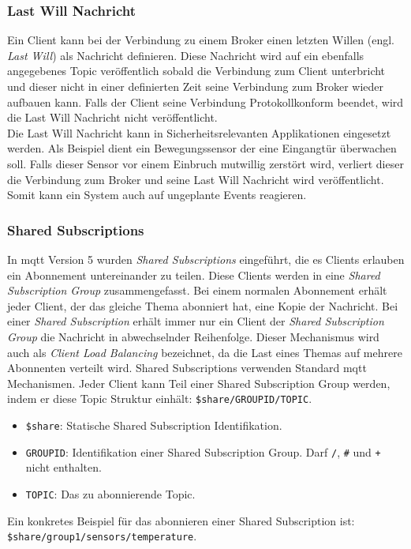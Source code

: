 \subsubsection{Last Will Nachricht} \label{s:last-will}
Ein Client kann bei der Verbindung zu einem Broker einen letzten Willen (engl. \textit{Last Will}) als Nachricht definieren. Diese Nachricht wird auf ein ebenfalls angegebenes Topic veröffentlich sobald die Verbindung zum Client unterbricht und dieser nicht in einer definierten Zeit seine Verbindung zum Broker wieder aufbauen kann. Falls der Client seine Verbindung Protokollkonform beendet, wird die Last Will Nachricht nicht veröffentlicht.
\cite{soniSURVEYMQTTPROTOCOL}\\
Die Last Will Nachricht kann in Sicherheitsrelevanten Applikationen eingesetzt werden. Als Beispiel dient ein Bewegungssensor der eine Eingangtür überwachen soll. Falls dieser Sensor vor einem Einbruch mutwillig zerstört wird, verliert dieser die Verbindung zum Broker und seine Last Will Nachricht wird veröffentlicht. Somit kann ein System auch auf ungeplante Events reagieren.

\subsubsection{Shared Subscriptions} \label{s:shared-subsriptions}
In \ac{mqtt} Version 5 wurden \textit{Shared Subscriptions} eingeführt, die es Clients erlauben ein Abonnement untereinander zu teilen. Diese Clients werden in eine \textit{Shared Subscription Group} zusammengefasst. Bei einem normalen Abonnement erhält jeder Client, der das gleiche Thema abonniert hat, eine Kopie der Nachricht. Bei einer \textit{Shared Subscription} erhält immer nur ein Client der \textit{Shared Subscription Group} die Nachricht in abwechselnder Reihenfolge. Dieser Mechanismus wird auch als \textit{Client Load Balancing} bezeichnet, da die Last eines Themas auf mehrere Abonnenten verteilt wird.\cite{raschbichlerMQTTHowNew}
Shared Subscriptions verwenden Standard \ac{mqtt} Mechanismen. Jeder Client kann Teil einer Shared Subscription Group werden, indem er diese Topic Struktur einhält: \verb|$share/GROUPID/TOPIC|.
\begin{itemize}
    \item \verb|$share|: Statische Shared Subscription Identifikation.
    \item \verb|GROUPID|: Identifikation einer Shared Subscription Group. Darf \verb|/|, \verb|#| und \verb|+| nicht enthalten.
    \item \verb|TOPIC|: Das zu abonnierende Topic.
\end{itemize}
Ein konkretes Beispiel für das abonnieren einer Shared Subscription ist: \verb|$share/group1/sensors/temperature|.

